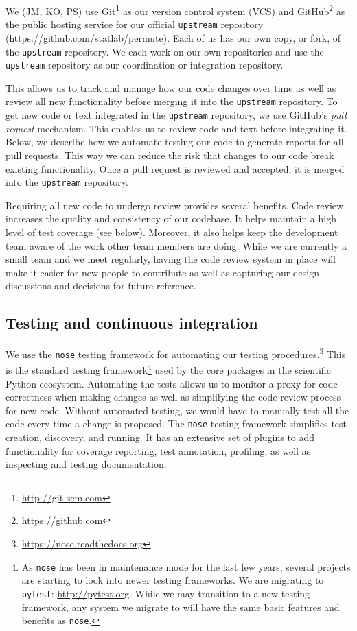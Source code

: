 \documentclass[]{article}
\begin{document}
We (JM, KO, PS) use Git\footnote{\url{http://git-scm.com}} as our version
control system (VCS) and GitHub\footnote{\url{https://github.com}} as the
public hosting service for our official \texttt{upstream} repository
(\url{https://github.com/statlab/permute}).
Each of us has our own copy, or fork, of the \texttt{upstream} repository.
We each work on our own repositories and use the \texttt{upstream} repository
as our coordination or integration repository.

This allows us to track and manage how our code changes over time as well as
review all new functionality before merging it into the \texttt{upstream}
repository.
To get new code or text integrated in the \texttt{upstream} repository, we use
GitHub's \emph{pull request} mechanism.
This enables us to review code and text before integrating it.
Below, we describe how we automate testing our code to generate reports for all
pull requests.
This way we can reduce the risk that changes to our code break existing
functionality.
Once a pull request is reviewed and accepted, it is merged into the
\texttt{upstream} repository.

Requiring all new code to undergo review provides several benefits.
Code review increases the quality and consistency of our codebase.
It helps maintain a high level of test coverage (see below).
Moreover, it also helps keep the development team aware of the work other team
members are doing.
While we are currently a small team and we meet regularly, having the code
review system in place will make it easier for new people to contribute as well
as capturing our design discussions and decisions for future reference.

\subsection{\label{sec:test}Testing and continuous integration}

We use the \texttt{nose} testing framework for automating our testing
procedures.\footnote{\url{https://nose.readthedocs.org}}
This is the standard testing framework\footnote{As \texttt{nose} has been in
maintenance mode for the last few years, several projects are starting to look
into newer testing frameworks.
We are migrating to \texttt{pytest}: \url{http://pytest.org}.
While we may transition to a new testing framework, any system we
migrate to will have the same basic features and benefits as \texttt{nose}.}
used by the core packages in the scientific Python ecosystem.
Automating the tests allows us to monitor a proxy for code correctness when
making changes as well as simplifying the code review process for new code.
Without automated testing, we would have to manually test all the code every
time a change is proposed.
The \texttt{nose} testing framework simplifies test creation, discovery, and
running.
It has an extensive set of plugins to add functionality for coverage reporting,
test annotation, profiling, as well as inspecting and testing documentation.
\end{document}
